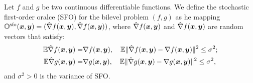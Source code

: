 \documentclass{article}
\begin{document}
\begin{dfn} \label{dfn:SFO}
Let $f$ and $g$ be two continuous differentiable functions. We define the stochastic first-order oralce (SFO) for the bilevel problem $(f,g)$ as he mapping ${\mathbb{O}}^{\rm sfo}({\bm{x}},{\bm{y}}) = (\hat \nabla f({\bm{x}},{\bm{y}}), \hat \nabla f({\bm{x}},{\bm{y}}))$, where $\hat \nabla f({\bm{x}},{\bm{y}})$ and $ \hat \nabla f({\bm{x}},{\bm{y}})$ are random vectors that satisfy:
\begin{align*}
    \mathbb{E} \hat \nabla f({\bm{x}},{\bm{y}}) =& \nabla f({\bm{x}},{\bm{y}}), \quad \mathbb{E} \Vert \hat \nabla f({\bm{x}},{\bm{y}}) - \nabla  f({\bm{x}},{\bm{y}}) \Vert^2 \le \sigma^2; \\
    \mathbb{E} \hat \nabla g({\bm{x}},{\bm{y}}) =& \nabla g({\bm{x}},{\bm{y}}), \quad \mathbb{E} \Vert \hat \nabla g({\bm{x}},{\bm{y}}) - \nabla  g({\bm{x}},{\bm{y}}) \Vert^2 \le \sigma^2,
\end{align*}
and $\sigma^2>0$ is the variance of SFO.
\end{dfn}
\end{document}
